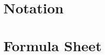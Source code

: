 \documentclass[a4paper,11pt]{scrbook}
\begin{document}
%
%




\chapter*{Notation}
% 

\chapter*{Formula Sheet}
%



\end{document}
